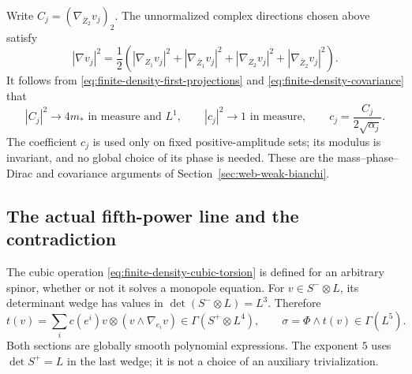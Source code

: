 Write $C_j=(\nabla_{\bar Z_2}v_j)_2$.  The unnormalized complex
directions chosen above satisfy
\[
 |\nabla v_j|^2=\frac12\left(
 |\nabla_{Z_1}v_j|^2+|\nabla_{\bar Z_1}v_j|^2+
 |\nabla_{Z_2}v_j|^2+|\nabla_{\bar Z_2}v_j|^2\right).
\]
It follows from \eqref{eq:finite-density-first-projections} and
\eqref{eq:finite-density-covariance} that
\begin{equation}
 |C_j|^2\longrightarrow4m_*\text{ in measure and }L^1,
 \qquad
 |c_j|^2\longrightarrow1\text{ in measure},\qquad
 c_j=\frac{C_j}{2\sqrt{\alpha_j}}.
 \label{eq:finite-density-surviving-modulus}
\end{equation}
The coefficient $c_j$ is used only on fixed positive-amplitude sets;
its modulus is invariant, and no global choice of its phase is needed.
These are the mass--phase--Dirac and covariance arguments of
Section~\ref{sec:web-weak-bianchi}.

\subsection{The actual fifth-power line and the contradiction}

The cubic operation \eqref{eq:finite-density-cubic-torsion} is defined
for an arbitrary spinor, whether or not it solves a monopole equation.
For $v\in S^-\otimes L$, its determinant wedge has values in
$\det(S^-\otimes L)=L^3$.  Therefore
\begin{equation}
 t(v)=\sum_i c(e^i)v\otimes(v\wedge\nabla_{e_i}v)
       \in\Gamma(S^+\otimes L^4),\qquad
 \sigma=\Phi\wedge t(v)\in\Gamma(L^5).
 \label{eq:finite-density-fifth-line}
\end{equation}
Both sections are globally smooth polynomial expressions.  The
exponent $5$ uses $\det S^+=L$ in the last wedge; it is not a
choice of an auxiliary trivialization.

